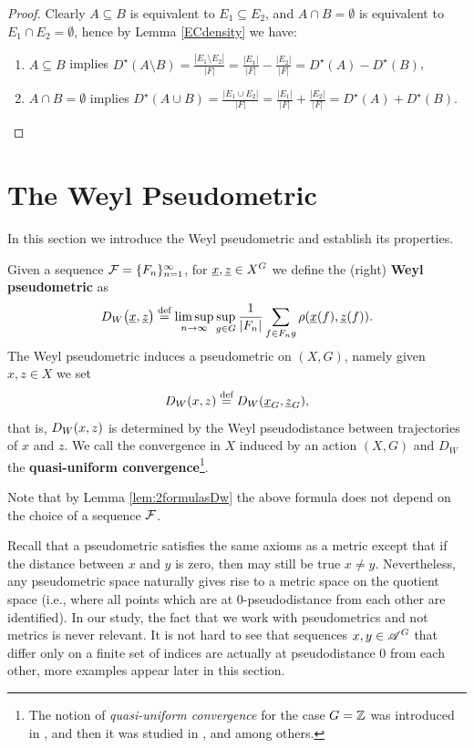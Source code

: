 \begin{proof}
Clearly $A\subseteq B$ is equivalent to $E_1\subseteq E_2$, and $A\cap B=\emptyset$ is equivalent to $E_1\cap E_2=\emptyset$, hence by Lemma \ref{ECdensity} we have:
\begin{enumerate}
\item $A\subseteq B$ implies $\displaystyle D^\star(A\setminus B)= \frac{|E_1\setminus E_2|}{|F|} =\frac{|E_1|}{|F|} -\frac{|E_2|}{|F|} =  D^\star(A)-D^\star(B)$,
\item $A\cap B=\emptyset$ implies  $\displaystyle D^\star(A\cup B)=\frac{|E_1\cup E_2|}{|F|} =\frac{|E_1|}{|F|} +\frac{|E_2|}{|F|} = D^\star(A)+D^\star(B)$.\qedhere
\end{enumerate}
\end{proof}


\section{The Weyl Pseudometric}\label{section:weyl}
In this section we introduce the Weyl pseudometric and establish its properties.

\begin{defn}\label{def:Weyl}
Given a \Folner sequence $\operatorname{\mathcal{F}}=\{F_n\}_{n=1}^\infty$, for $\underline{x},\underline{z} \in X^G$ we define the (right) {\bf Weyl pseudometric} as
\[
D_W\big(\underline{x},\underline{z}\big)\stackrel{\textup{def}}{=}\limsup_{n\to\infty}\sup_{g\in G}\frac{1}{|F_n|}\sum_{f\in F_ng}\rho(\underline{x}(f),\underline{z}(f)).
\]
The Weyl pseudometric induces a pseudometric on $(X,G)$, namely given $x,z\in X$ we set 
\[
D_W(x,z)\stackrel{\textup{def}}{=} D_W(\underline{x}_G,\underline{z}_G),
\]
that is, $D_W(x,z)$ is determined by the Weyl pseudodistance between trajectories of $x$ and $z$.
We call the convergence in $X$ induced by an action $(X,G)$ and $D_W$ the {\bf quasi-uniform  convergence}\footnote{The notion of \emph{quasi-uniform convergence} for the case $G=\mathbb{Z}$ was introduced in \cite{JK69}, and then it was studied in \cite{DI88}, \cite{DG16} and \cite{KLO16} among others.}. 
 \end{defn}
\noindent
Note that by Lemma \ref{lem:2formulasDw} the above formula does not depend on the choice of a \Folner sequence $\operatorname{\mathcal{F}}$.

Recall that a pseudometric satisfies the same axioms as a metric except that if the distance between $x$ and $y$ is zero, then may still be true $x\neq y$.
%
Nevertheless, any pseudometric space naturally gives rise to a metric space on the quotient space (i.e., where all points which are at $0$-pseudodistance from each other are identified).
%
In our study, the fact that we work with pseudometrics and not metrics is never relevant. 
%
It is not hard to see that sequences $x,y\in\mathscr{A}^G$ that differ only on a finite set of indices are actually at pseudodistance $0$ from each other, more examples appear later in this section.


